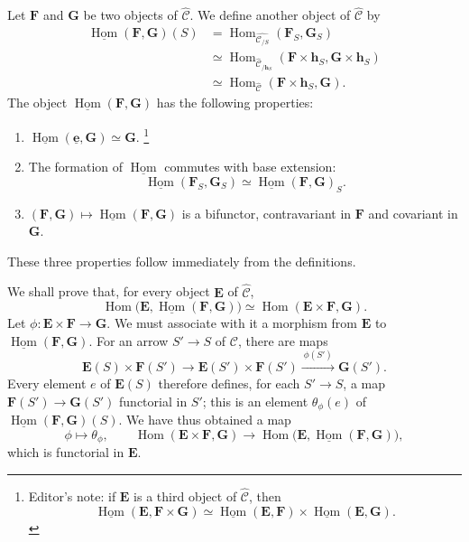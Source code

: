 Let \(\mathbf F\) and \(\mathbf G\) be two objects of
\(\widehat{\mathscr C}\). We define another object of
\(\widehat{\mathscr C}\) by
\begin{align*}
  \underline{\operatorname{Hom}}(\mathbf F,\mathbf G)(S)
  &={}\operatorname{Hom}_{\widehat{\mathscr C_{/S}}}
       (\mathbf F_S,\mathbf G_S)\\
  &\simeq\operatorname{Hom}_{\widehat{\mathscr C}_{/\mathbf h_S}}
       (\mathbf F\times\mathbf h_S,\mathbf G\times\mathbf h_S)\\
  &\simeq\operatorname{Hom}_{\widehat{\mathscr C}}
       (\mathbf F\times\mathbf h_S,\mathbf G).
\end{align*}
The object \(\underline{\operatorname{Hom}}(\mathbf F,\mathbf G)\) has
the following properties:
\begin{enumerate}
  \item[(i)]
    \(\underline{\operatorname{Hom}}(\underline{\mathbf e},\mathbf G)
      \simeq\mathbf G\).
    \footnote{Editor's note: if \(\mathbf E\) is a third object of
    \(\widehat{\mathscr C}\), then
    \[
      \underline{\operatorname{Hom}}(\mathbf E,\mathbf F\times\mathbf G)
      \simeq
      \underline{\operatorname{Hom}}(\mathbf E,\mathbf F)
        \times
      \underline{\operatorname{Hom}}(\mathbf E,\mathbf G).
    \]}
  \item[(ii)] The formation of \(\underline{\operatorname{Hom}}\) commutes
    with base extension:
    \[
      \underline{\operatorname{Hom}}(\mathbf F_S,\mathbf G_S)
        \simeq
      \underline{\operatorname{Hom}}(\mathbf F,\mathbf G)_S.
    \]
  \item[(iii)]
    \((\mathbf F,\mathbf G)\mapsto
      \underline{\operatorname{Hom}}(\mathbf F,\mathbf G)\)
    is a bifunctor, contravariant in \(\mathbf F\) and covariant in
    \(\mathbf G\).
\end{enumerate}
These three properties follow immediately from the definitions.

We shall prove that, for every object \(\mathbf E\) of
\(\widehat{\mathscr C}\),
\[
  \operatorname{Hom}
    \bigl(\mathbf E,
      \underline{\operatorname{Hom}}(\mathbf F,\mathbf G)\bigr)
    \simeq
  \operatorname{Hom}(\mathbf E\times\mathbf F,\mathbf G).
\]
Let \(\phi:\mathbf E\times\mathbf F\to\mathbf G\). We must associate
with it a morphism from \(\mathbf E\) to
\(\underline{\operatorname{Hom}}(\mathbf F,\mathbf G)\). For an arrow
\(S'\to S\) of \(\mathscr C\), there are maps
\[
  \mathbf E(S)\times\mathbf F(S')
    \longrightarrow
  \mathbf E(S')\times\mathbf F(S')
    \xrightarrow{\ \phi(S')\ }
  \mathbf G(S').
\]
Every element \(e\) of \(\mathbf E(S)\) therefore defines, for each
\(S'\to S\), a map \(\mathbf F(S')\to\mathbf G(S')\) functorial in
\(S'\); this is an element \(\theta_\phi(e)\) of
\(\underline{\operatorname{Hom}}(\mathbf F,\mathbf G)(S)\). We have thus
obtained a map
\[
  \phi\longmapsto\theta_\phi,
  \qquad
  \operatorname{Hom}(\mathbf E\times\mathbf F,\mathbf G)
    \longrightarrow
  \operatorname{Hom}
    \bigl(\mathbf E,
      \underline{\operatorname{Hom}}(\mathbf F,\mathbf G)\bigr),
\]
which is functorial in \(\mathbf E\).


